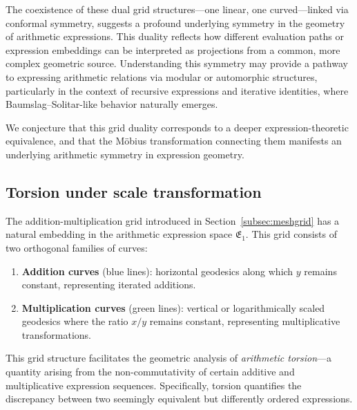 The coexistence of these dual grid structures—one linear, one curved—linked via conformal symmetry, suggests a profound underlying symmetry in the geometry of arithmetic expressions. This duality reflects how different evaluation paths or expression embeddings can be interpreted as projections from a common, more complex geometric source. Understanding this symmetry may provide a pathway to expressing arithmetic relations via modular or automorphic structures, particularly in the context of recursive expressions and iterative identities, where Baumslag–Solitar-like behavior naturally emerges.

We conjecture that this grid duality corresponds to a deeper expression-theoretic equivalence, and that the Möbius transformation connecting them manifests an underlying arithmetic symmetry in expression geometry.

\subsection{Torsion under scale transformation}\label{subsec:gridsandtorsion}

The addition-multiplication grid introduced in Section~\ref{subsec:meshgrid} has a natural embedding in the arithmetic expression space $\mathfrak{E}_1$. This grid consists of two orthogonal families of curves:

\begin{enumerate}
\item \textbf{Addition curves} (blue lines): horizontal geodesics along which $y$ remains constant, representing iterated additions.
\item \textbf{Multiplication curves} (green lines): vertical or logarithmically scaled geodesics where the ratio $x/y$ remains constant, representing multiplicative transformations.
\end{enumerate}

This grid structure facilitates the geometric analysis of \emph{arithmetic torsion}—a quantity arising from the non-commutativity of certain additive and multiplicative expression sequences. Specifically, torsion quantifies the discrepancy between two seemingly equivalent but differently ordered expressions.

